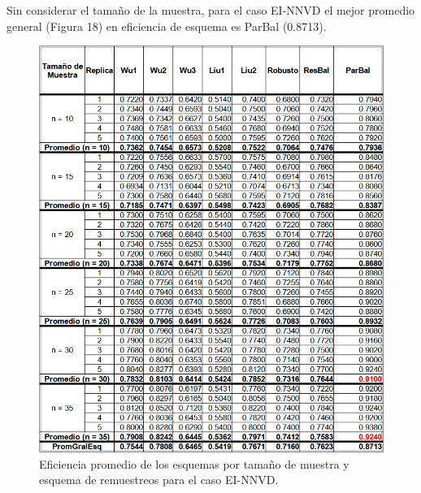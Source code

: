 Sin considerar el tamaño de la muestra, para el caso EI-NNVD el mejor promedio general (Figura 18) en eficiencia de esquema es ParBal (0.8713).


\begin{figure}[ht] 
	\centering 
	\includegraphics[width=0.70\linewidth]{img/EI_NNVD_Efic_Esq.png} 
	\caption{Eficiencia promedio de los esquemas por tamaño de muestra y esquema de remuestreos para el caso EI-NNVD.} 
	\label{fig:EI_NNVD_Esq}
\end{figure}
\FloatBarrier



